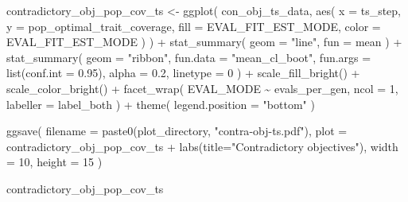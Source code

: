 \documentclass[
]{book}
\newenvironment{Shaded}{\begin{snugshade}}{\end{snugshade}}
\newcommand{\AttributeTok}[1]{\textcolor[rgb]{0.77,0.63,0.00}{#1}}
\newcommand{\DecValTok}[1]{\textcolor[rgb]{0.00,0.00,0.81}{#1}}
\newcommand{\FloatTok}[1]{\textcolor[rgb]{0.00,0.00,0.81}{#1}}
\newcommand{\FunctionTok}[1]{\textcolor[rgb]{0.00,0.00,0.00}{#1}}
\newcommand{\NormalTok}[1]{#1}
\newcommand{\OtherTok}[1]{\textcolor[rgb]{0.56,0.35,0.01}{#1}}
\newcommand{\SpecialCharTok}[1]{\textcolor[rgb]{0.00,0.00,0.00}{#1}}
\newcommand{\StringTok}[1]{\textcolor[rgb]{0.31,0.60,0.02}{#1}}
\begin{document}
\begin{Shaded}
\begin{Highlighting}[]
\NormalTok{contradictory\_obj\_pop\_cov\_ts }\OtherTok{\textless{}{-}} \FunctionTok{ggplot}\NormalTok{(}
\NormalTok{    con\_obj\_ts\_data,}
    \FunctionTok{aes}\NormalTok{(}
      \AttributeTok{x =}\NormalTok{ ts\_step,}
      \AttributeTok{y =}\NormalTok{ pop\_optimal\_trait\_coverage,}
      \AttributeTok{fill =}\NormalTok{ EVAL\_FIT\_EST\_MODE,}
      \AttributeTok{color =}\NormalTok{ EVAL\_FIT\_EST\_MODE}
\NormalTok{    )}
\NormalTok{  ) }\SpecialCharTok{+}
  \FunctionTok{stat\_summary}\NormalTok{(}
    \AttributeTok{geom =} \StringTok{"line"}\NormalTok{,}
    \AttributeTok{fun =}\NormalTok{ mean}
\NormalTok{  ) }\SpecialCharTok{+}
  \FunctionTok{stat\_summary}\NormalTok{(}
    \AttributeTok{geom =} \StringTok{"ribbon"}\NormalTok{,}
    \AttributeTok{fun.data =} \StringTok{"mean\_cl\_boot"}\NormalTok{,}
    \AttributeTok{fun.args =} \FunctionTok{list}\NormalTok{(}\AttributeTok{conf.int =} \FloatTok{0.95}\NormalTok{),}
    \AttributeTok{alpha =} \FloatTok{0.2}\NormalTok{,}
    \AttributeTok{linetype =} \DecValTok{0}
\NormalTok{  ) }\SpecialCharTok{+}
  \FunctionTok{scale\_fill\_bright}\NormalTok{() }\SpecialCharTok{+}
  \FunctionTok{scale\_color\_bright}\NormalTok{() }\SpecialCharTok{+}
  \FunctionTok{facet\_wrap}\NormalTok{(}
\NormalTok{    EVAL\_MODE }\SpecialCharTok{\textasciitilde{}}\NormalTok{ evals\_per\_gen,}
    \AttributeTok{ncol =} \DecValTok{1}\NormalTok{,}
    \AttributeTok{labeller =}\NormalTok{ label\_both}
\NormalTok{  ) }\SpecialCharTok{+}
  \FunctionTok{theme}\NormalTok{(}
    \AttributeTok{legend.position =} \StringTok{"bottom"}
\NormalTok{  )}

\FunctionTok{ggsave}\NormalTok{(}
  \AttributeTok{filename =} \FunctionTok{paste0}\NormalTok{(plot\_directory, }\StringTok{"contra{-}obj{-}ts.pdf"}\NormalTok{),}
  \AttributeTok{plot =}\NormalTok{ contradictory\_obj\_pop\_cov\_ts }\SpecialCharTok{+} \FunctionTok{labs}\NormalTok{(}\AttributeTok{title=}\StringTok{"Contradictory objectives"}\NormalTok{),}
  \AttributeTok{width =} \DecValTok{10}\NormalTok{,}
  \AttributeTok{height =} \DecValTok{15}
\NormalTok{)}
\end{Highlighting}
\end{Shaded}

\begin{Shaded}
\begin{Highlighting}[]
\NormalTok{contradictory\_obj\_pop\_cov\_ts}
\end{Highlighting}
\end{Shaded}
\end{document}
